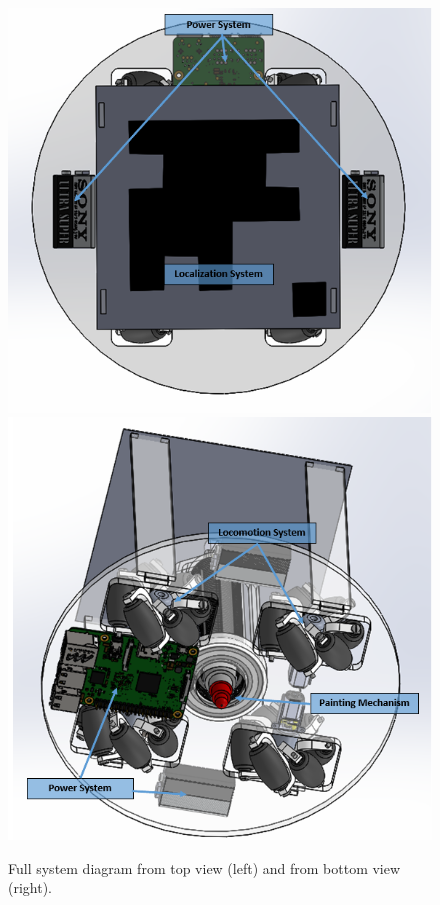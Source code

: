 \begin{figure}
\centering
\includegraphics[width=0.9\columnwidth]{hardware/CAD/Full System/Full_System_Top.PNG}
\includegraphics[width=0.9\columnwidth]{hardware/CAD/Full System/Full_System_Bottom.PNG}
\caption{Full system diagram from top view (left) and from bottom view (right).}
\label{fig:full-sys-diagram-bottom}
\end{figure}

